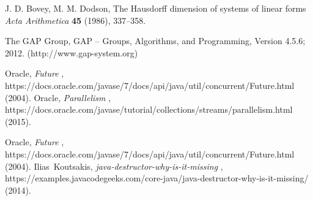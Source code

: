 \documentclass[10pt]{article}  %
\theoremstyle{definition}
\theoremstyle{remark}
\begin{document}
%
%
%
\begin{thebibliography}{99}

% 
%



%
J. D. Bovey, M. M. Dodson,                         %
The Hausdorff dimension of systems of linear forms %
{\em Acta Arithmetica}                             %
{\bf 45}                                           %
(1986), 337--358.                                   %

%
The GAP Group, GAP -- Groups, Algorithms, and Programming,  %
Version 4.5.6; 2012. %
(http://www.gap-system.org)  %


%
Oracle,                                            %
{\em Future }, %
https://docs.oracle.com/javase/7/docs/api/java/util/concurrent/Future.html %
(2004).                                              %
Oracle,                                            %
{\em Parallelism }, %
https://docs.oracle.com/javase/tutorial/collections/streams/parallelism.html                       %
(2015).                                              %

%
Oracle,                                            %
{\em Future }, %
https://docs.oracle.com/javase/7/docs/api/java/util/concurrent/Future.html %
(2004).                                              %
Ilias\ Koutsakis,                                            %
{\em java-destructor-why-is-it-missing }, %
https://examples.javacodegeeks.com/core-java/java-destructor-why-is-it-missing/ %
(2014).                                              %

\end{thebibliography}
\end{document}
